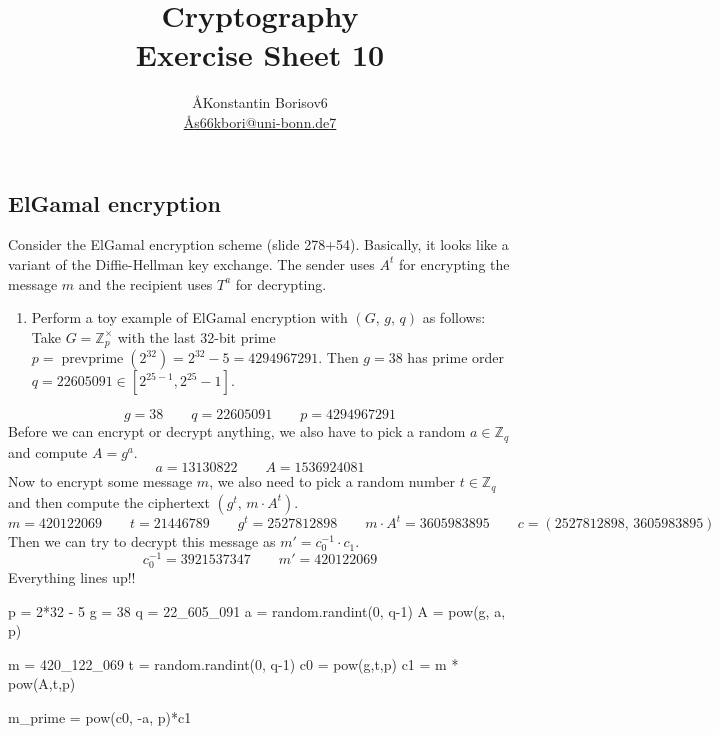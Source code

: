 \documentclass{article}
\title{Cryptography \\ Exercise Sheet 10}
\author{
  \AA{Konstantin Borisov}{6} \\
  \href{mailto:\AA{s66kbori@uni-bonn.de}{7}}{\AA{s66kbori@uni-bonn.de}{7}}
}
\newcommand{\Z}{\mathbb{Z}}
\begin{document}
  \maketitle

  \setcounter{section}{10}
  \subsection{ElGamal encryption}
  \begin{centerframebox}
    Consider the ElGamal encryption scheme (slide 278+54). Basically, it looks
    like a variant of the Diffie-Hellman key exchange. The sender uses $A^t$
    for encrypting the message $m$ and the recipient uses $T^a$ for decrypting.

    \begin{enumerate}[label=(\roman*)]
      \item Perform a toy example of ElGamal encryption with $(G,\, g,\, q)$ as follows:
      Take $G = \Z^\times_p$  with the last 32-bit prime $p = \operatorname{prevprime}(2^{32}) = 2^{32} - 5 = 4 294 967 291$.
      Then $g = 38$ has prime order $q = 22 605 091 \in [2^{25-1}, 2^{25}-1]$.
    \end{enumerate}
  \end{centerframebox}
  \[ g = 38 \qquad q = 22 605 091 \qquad p = 4 294 967 291 \]
  Before we can encrypt or decrypt anything, we also have to pick a random $a \in \Z_q$ and compute $A = g^a$.
  \[ a = 13 130 822 \qquad A = 1 536 924 081 \]
  Now to encrypt some message $m$, we also need to pick a random number $t \in \Z_q$
  and then compute the ciphertext $(g^t,\, m \cdot A^t)$.
  \[ m = 420 122 069 \qquad t = 21 446 789 \qquad  g^t = 2 527 812 898 \qquad m \cdot A^t = 3 605 983 895
  \qquad c = (2 527 812 898,\, 3 605 983 895 ) \]
  Then we can try to decrypt this message as $m' = c_0^{-1} \cdot c_1$.
  \[ c_0^{-1} = 3 921 537 347 \qquad m' = 420 122 069 \]
  Everything lines up!!

  \begin{mylisting}
    p = 2*32 - 5
    g = 38
    q = 22_605_091
    a = random.randint(0, q-1)
    A = pow(g, a, p)

    m = 420_122_069
    t = random.randint(0, q-1)
    c0 = pow(g,t,p)
    c1 = m * pow(A,t,p) %

    m_prime = pow(c0, -a, p)*c1 %
  \end{mylisting}
\end{document}
